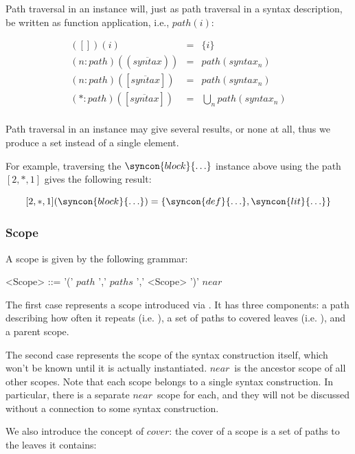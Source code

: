 \documentclass{kththesis}
\begin{document}
Path traversal in an instance will, just as path traversal in a syntax description, be written as function application, i.e., $path(i)$:

$$
\begin{array}{rcl}
([])(i) & = & \{i\} \\
(n : path)((\overline{syntax})) & = & path(syntax_n) \\
(n : path)([\overline{syntax}]) & = & path(syntax_n) \\
(* : path)([\overline{syntax}]) & = & \bigcup_n path(syntax_n) \\
\end{array}
$$

Path traversal in an instance may give several results, or none at all, thus we produce a set instead of a single element.

For example, traversing the $\syncon{block}\{\ldots\}$ instance above using the path $[2, *, 1]$ gives the following result:

$$
[2, *, 1](\syncon{block}\{\ldots\}) = \{\syncon{def}\{\ldots\}, \syncon{lit}\{\ldots\}\}
$$

\subsubsection{Scope}

\newcommand{\near}{\ensuremath{\mathit{near}}}

A scope is given by the following grammar:

\begin{grammar}
<Scope> ::= '(' $path$ ',' $paths$ ',' <Scope> ')'
  \alt \near
\end{grammar}

The first case represents a scope introduced via . It has three components: a path describing how often it repeats (i.e. ), a set of paths to covered leaves (i.e. ), and a parent scope.

The second case represents the scope of the syntax construction itself, which won't be known until it is actually instantiated. \near\ is the ancestor scope of all other scopes. Note that each scope belongs to a single syntax construction. In particular, there is a separate \near\ scope for each, and they will not be discussed without a connection to some syntax construction.

\newcommand{\cover}{\ensuremath{\mathit{cover}}}
We also introduce the concept of \cover: the cover of a scope is a set of paths to the leaves it contains:
\end{document}
